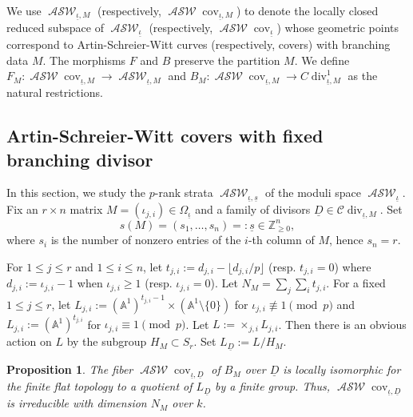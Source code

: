 \documentclass{compositio}
\newtheorem{proposition}[theorem]{Proposition}
\theoremstyle{remark}
\theoremstyle{remark}
\DeclareMathOperator{\cov}{cov}
\DeclareMathOperator{\divisor}{div}
\DeclareMathOperator{\ASW}{\mathcal{ASW}}
\begin{document}
We use $\ASW_{\underline{\iota},M}$ (respectively, $\ASW\cov_{\underline{\iota},M}$) to denote the locally closed reduced subspace of $\ASW_{\underline{\iota}}$ (respectively, $\ASW\cov_{\underline{\iota}}$) whose geometric points correspond to Artin-Schreier-Witt curves (respectively, covers) with branching data $M$. The morphisms $F$ and $B$ preserve the partition $M$. We define $F_M:\ASW\cov_{\underline{\iota},M} \rightarrow \ASW_{\underline{\iota},M}$ and $B_M:\ASW\cov_{\underline{\iota},M} \rightarrow C\divisor^1_{\underline{\iota},M}$ as the natural restrictions.

\subsection{Artin-Schreier-Witt covers with fixed branching divisor}
In this section, we study the $p$-rank strata $\ASW_{\underline{\iota}, \underline{s}}$ of the moduli space $\ASW_{\underline{\iota}}$. Fix an $r \times n$ matrix $M=(\iota_{j,i}) \in \Omega_{\underline{\iota}}$ and a family of divisors $\underline{D} \in \mathcal{C} \divisor_{\underline{\iota},M}$. Set
\[ s(M)=(s_1, \ldots, s_n)=: \underline{s} \in \mathbb{Z}_{\ge 0}^n, \]
where $s_i$ is the number of nonzero entries of the $i$-th column of $M$, hence $s_n=r$. 


For $1 \le j \le r$ and $1 \le i \le n$, let $t_{j,i}:=d_{j,i}-\lfloor d_{j,i}/p \rfloor$ (resp. $t_{j,i}=0$) where $d_{j,i}:=\iota_{j,i}-1$ when $\iota_{j,i} \ge 1$ (resp. $\iota_{j,i}=0$). Let $N_M=\sum_j \sum_i t_{j,i}$. For a fixed $1 \le j \le r$, let $L_{j,i}:=(\mathbb{A}^1)^{t_{j,i}-1} \times (\mathbb{A}^1 \setminus \{ 0\})$ for $\iota_{j,i} \not\equiv 1 \pmod {p}$ and $L_{j,i}:=(\mathbb{A}^1)^{t_{j,i}}$ for $\iota_{j,i} \equiv 1 \pmod{p}$. Let $L:= \times_{j,i} L_{j,i}$. Then there is an obvious action on $L$ by the subgroup $H_M \subset S_r$. Set $L_{\underline{D}}:=L/H_M$.


\begin{proposition}
\label{propfiberofBM}
The fiber $\ASW\cov_{\underline{\iota},\underline{D}}$ of $B_M$ over $\underline{D}$  is locally isomorphic for the finite flat topology to a quotient of $L_{\underline{D}}$ by a finite group. Thus,  $\ASW\cov_{\underline{\iota},\underline{D}}$ is irreducible with dimension $N_M$ over $k$. 
\end{proposition}
\end{document}
